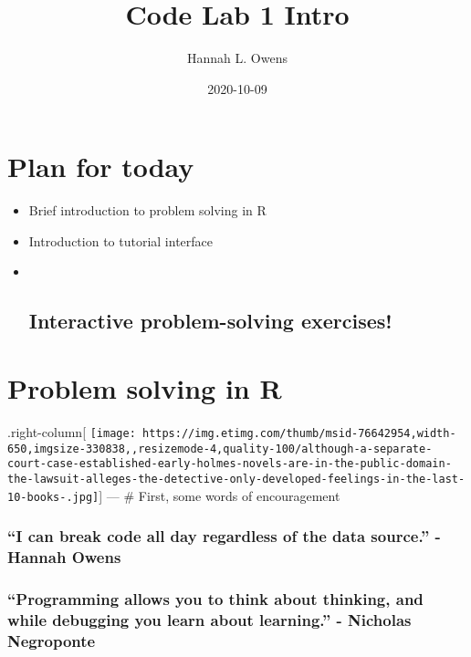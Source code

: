 \documentclass[
]{article}
\title{Code Lab 1 Intro}
\author{Hannah L. Owens}
\date{2020-10-09}
\begin{document}
\maketitle

\hypertarget{plan-for-today}{%
\section{Plan for today}\label{plan-for-today}}

\begin{itemize}
\item
  Brief introduction to problem solving in R
\item
  Introduction to tutorial interface
\item ~
  \hypertarget{interactive-problem-solving-exercises}{%
  \subsection{Interactive problem-solving
  exercises!}\label{interactive-problem-solving-exercises}}
\end{itemize}

\hypertarget{problem-solving-in-r}{%
\section{Problem solving in R}\label{problem-solving-in-r}}

.right-column{[}
\texttt{[image: https://img.etimg.com/thumb/msid-76642954,width-650,imgsize-330838,,resizemode-4,quality-100/although-a-separate-court-case-established-early-holmes-novels-are-in-the-public-domain-the-lawsuit-alleges-the-detective-only-developed-feelings-in-the-last-10-books-.jpg]}{]}
--- \# First, some words of encouragement

\hypertarget{i-can-break-code-all-day-regardless-of-the-data-source.---hannah-owens}{%
\subsubsection{``I can break code all day regardless of the data
source.'' - Hannah
Owens}\label{i-can-break-code-all-day-regardless-of-the-data-source.---hannah-owens}}

\hypertarget{programming-allows-you-to-think-about-thinking-and-while-debugging-you-learn-about-learning.---nicholas-negroponte}{%
\subsubsection{``Programming allows you to think about thinking, and
while debugging you learn about learning.'' - Nicholas
Negroponte}\label{programming-allows-you-to-think-about-thinking-and-while-debugging-you-learn-about-learning.---nicholas-negroponte}}
\end{document}
